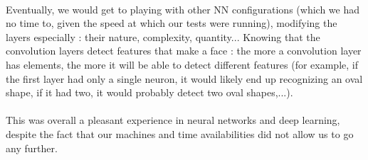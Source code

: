 \documentclass[french]{article}
\begin{document}
\paragraph{} Eventually, we would get to playing with other NN configurations (which we had no time to, given the speed at which our tests were running), modifying the layers especially : their nature, complexity, quantity... Knowing that the convolution layers detect features that make a face : the more a convolution layer has elements, the more it will be able to detect different features (for example, if the first layer had only a single neuron, it would likely end up recognizing an oval shape, if it had two, it would probably detect two oval shapes,...).

\paragraph{} This was overall a pleasant experience in neural networks and deep learning, despite the fact that our machines and time availabilities did not allow us to go any further.
\end{document}
